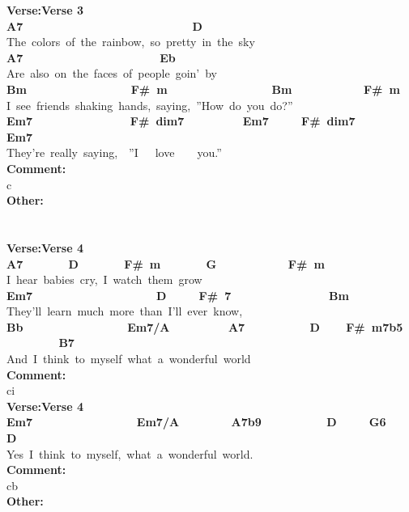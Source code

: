 \documentclass{scrartcl}
\begin{document}
{\textbf{Verse:Verse 3} \\
\textbf{ \hspace*{4em}A7~~~~~~~~~~~~~~~~~~~~~~~~~~D} \\
The~colors~of~the~rainbow,~so~pretty~in~the~sky \\
\textbf{ \hspace*{4em}A7~~~~~~~~~~~~~~~~~~~~~Eb} \\
Are~also~on~the~faces~of~people~goin'~by \\
\textbf{ \hspace*{6em}Bm~~~~~~~~~~~~~~~~F\#~m~~~~~~~~~~~~~~~~Bm~~~~~~~~~~~F\#~m} \\
I~see~friends~shaking~hands,~saying,~''How~do~you~do?'' \\
\textbf{ Em7~~~~~~~~~~~~~~~F\#~dim7~~~~~~~~~Em7~~~~~F\#~dim7~~~~~~~~Em7} \\
They're~really~saying,~~''I~~~love~~~~you.'' \\
\textbf{Comment:} \\
c \\
\textbf{Other:} \\
\textbf{ } \\
 \\
\textbf{Verse:Verse 4} \\
\textbf{ A7~~~~~~~D~~~~~~~F\#~m~~~~~~~G~~~~~~~~~~~F\#~m} \\
I~hear~babies~cry,~I~watch~them~grow \\
\textbf{ Em7~~~~~~~~~~~~~~~~~~~D~~~~~F\#~7~~~~~~~~~~~~~~~Bm} \\
They'll~learn~much~more~than~I'll~ever~know, \\
\textbf{ \hspace*{6em}Bb~~~~~~~~~~~~~~~~Em7/A~~~~~~~~~A7~~~~~~~~~~D~~~~F\#~m7b5~~~~~~~~~B7} \\
And~I~think~to~myself~what~a~wonderful~world \\
\textbf{Comment:} \\
ci \\
\textbf{Verse:Verse 4} \\
\textbf{ \hspace*{6em}Em7~~~~~~~~~~~~~~~~Em7/A~~~~~~~~A7b9~~~~~~~~~~D~~~~~G6~~~~D} \\
Yes~I~think~to~myself,~what~a~wonderful~world. \\
\textbf{Comment:} \\
cb \\
\textbf{Other:} \\
\textbf{ } \\
 \\
}
\end{document}
